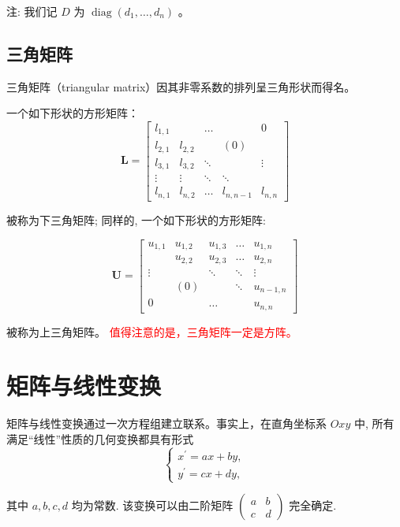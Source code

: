注: 我们记 $D$ 为 $\operatorname{diag}\left(d_1, \ldots, d_n\right)$ 。

\subsection{三角矩阵}

三角矩阵（triangular matrix）因其非零系数的排列呈三角形状而得名。

一个如下形状的方形矩阵：
$$
\mathbf{L}=\left[\begin{array}{ccccc}
l_{1,1} & & \ldots & & 0 \\
l_{2,1} & l_{2,2} & & (0) & \\
l_{3,1} & l_{3,2} & \ddots & & \vdots \\
\vdots & \vdots & \ddots & \ddots & \\
l_{n, 1} & l_{n, 2} & \ldots & l_{n, n-1} & l_{n, n}
\end{array}\right]
$$

被称为下三角矩阵; 同样的, 一个如下形状的方形矩阵:

$$
\mathbf{U}=\left[\begin{array}{ccccc}
u_{1,1} & u_{1,2} & u_{1,3} & \ldots & u_{1, n} \\
& u_{2,2} & u_{2,3} & \ldots & u_{2, n} \\
\vdots & & \ddots & \ddots & \vdots \\
& (0) & & \ddots & u_{n-1, n} \\
0 & & \ldots & & u_{n, n}
\end{array}\right]
$$

被称为上三角矩阵。
\textcolor{red}{值得注意的是，三角矩阵一定是方阵。}

\section{矩阵与线性变换}
\label{sec:矩阵与线性变换}

\begin{note}
    矩阵与线性变换通过一次方程组建立联系。事实上，在直角坐标系 $O x y$ 中, 所有满足“线性”性质的几何变换都具有形式
$$
\left\{\begin{array}{l}
x^{\prime}=a x+b y, \\
y^{\prime}=c x+d y,
\end{array}\right.
$$

其中 $a, b, c, d$ 均为常数. 该变换可以由二阶矩阵 $\left(\begin{array}{ll}a & b \\ c & d\end{array}\right)$ 完全确定.
\end{note}

